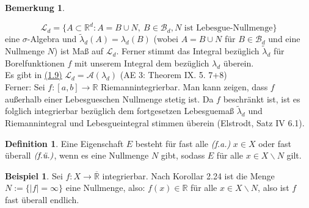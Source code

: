 \documentclass[a4paper]{scrreprt}
\newcommand{\R}{\mathbb{R}}
\newcommand{\Rq}{\overline{\R}}
\newcommand{\Borel}{\mathcal{B}}
\newcommand{\Bd}{\Borel_d}
\newcommand{\Leb}{\mathcal{L}}
\newcommand{\jlabel}[1]{\label{j_#1}}
\newcommand{\jhyperref}[2]{\hyperref[j_#1]{#2}}
\newcommand{\jlink}[1]{\jhyperref{#1}{#1}}
\newcommand{\fu}{\text{\textit{(f.ü.)}}}
\newcommand{\jabb}[3]{ #1: #2 \rightarrow #3 }
\theoremstyle{plain}
\theoremstyle{definition}
\newtheorem{defn}[thm]{Definition}
\newtheorem{expl}[thm]{Beispiel}
\newtheorem{bem}[thm]{Bemerkung}
\begin{document}
{{{{\begin{bem}
\begin{enumerate}
            \begin{displaymath}
                \Leb_d = \{A \subset \R^d: A = B\cup N,\ B\in \Bd, N \text{ ist Lebesgue-Nullmenge}\}
            \end{displaymath}
            eine $\sigma$-Algebra und $\tilde{\lambda}_d(A) = \lambda_d(B)$ (wobei $A= B\cup N$ für $B\in \Bd$ und eine Nullmenge $N$) ist Maß auf $\Leb_d$. Ferner stimmt das Integral bezüglich $\tilde{\lambda}_d$ für Borelfunktionen $f$ mit unserem Integral dem bezüglich $\lambda_d$ überein.\\
            Es gibt in \jlink{(1.9)} $\Leb_d = \mathcal{A}(\lambda_d)$ (AE 3: Theorem IX. 5. 7+8)\\
            Ferner: Sei $\jabb{f}{[a,b]}{\R}$ Riemannintegrierbar. Man kann zeigen, dass $f$ außerhalb einer Lebesgueschen Nullmenge stetig ist. Da $f$ beschränkt ist, ist es folglich integrierbar bezüglich dem fortgesetzen Lebesguemaß $\tilde{\lambda}_d$ und Riemannintegral und Lebesgueintegral stimmen überein (Elstrodt, Satz IV 6.1).
    \end{enumerate}
\end{bem}

\begin{defn}
\jlabel{Def 3.3}
    Eine Eigenschaft $E$ besteht für fast alle \textit{(f.a.)} $x\in X$ oder fast überall $\fu$, wenn es eine Nullmenge $N$ gibt, sodass $E$ für alle $x\in X\backslash N$ gilt.
\end{defn}

\begin{expl}
\jlabel{Bsp 3.4}
    Sei $\jabb{f}{X}{\Rq}$ integrierbar. Nach Korollar 2.24 ist die Menge $N:= \{|f| = \infty\}$ eine Nullmenge, also: $f(x) \in \R$ für alle $x\in X\backslash N$, also ist $f$ fast überall endlich.
\end{expl}


}}}}
\end{document}
